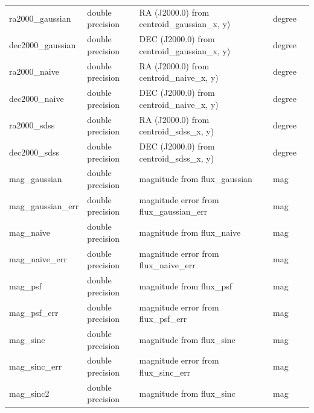 \documentclass[12pt]{article}
\begin{document}
\begin{table}[thbp]
\begin{center}
{\begin{tabular}{llllll}
ra2000\_gaussian & double precision & RA (J2000.0) from centroid\_gaussian\_x, y)           &                            & degree      &   \\
dec2000\_gaussian & double precision & DEC (J2000.0) from centroid\_gaussian\_x, y)          &                            & degree      &   \\
ra2000\_naive & double precision & RA (J2000.0) from centroid\_naive\_x, y)              &                            & degree      &   \\
dec2000\_naive & double precision & DEC (J2000.0) from centroid\_naive\_x, y)             &                            & degree      &   \\
ra2000\_sdss & double precision & RA (J2000.0) from centroid\_sdss\_x, y)               &                            & degree      &   \\
dec2000\_sdss & double precision & DEC (J2000.0) from centroid\_sdss\_x, y)              &                            & degree      &   \\
mag\_gaussian & double precision & magnitude from flux\_gaussian                        &                            & mag         &   \\
mag\_gaussian\_err & double precision & magnitude error from flux\_gaussian\_err                &                            & mag         &   \\
mag\_naive & double precision & magnitude from flux\_naive                           &                            & mag         &   \\
mag\_naive\_err & double precision & magnitude error from flux\_naive\_err                   &                            & mag         &   \\
mag\_psf & double precision & magnitude from flux\_psf                             &                            & mag         &   \\
mag\_psf\_err & double precision & magnitude error from flux\_psf\_err                     &                            & mag         &   \\
mag\_sinc & double precision & magnitude from flux\_sinc                            &                            & mag         &   \\
mag\_sinc\_err & double precision & magnitude error from flux\_sinc\_err                    &                            & mag         &   \\
mag\_sinc2 & double precision & magnitude from flux\_sinc                            &                            & mag         &   \\

\end{tabular}}
\end{center}
\end{table}
\end{document}
